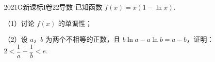 
\begin{problem}{2021}{G}{新课标I卷}{22}{导数}
已知函数 $ f(x)=x(1-\ln x) $.

（1）讨论 $ f(x) $ 的单调性；

（2）设 $ a $，$ b $ 为两个不相等的正数，且 $ b\ln a-a\ln b=a-b $，证明：  
$ 2<\dfrac{1}{a}+\dfrac{1}{b}<e $.
\end{problem}

\begin{answer}

\end{answer}

\begin{solutions}

\end{solutions}